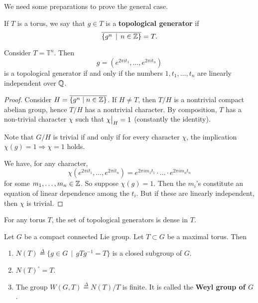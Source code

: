 \documentclass[11pt, english]{article}
\begin{document}
We need some preparations to prove the general case.

If $T$ is a torus, we say that $g \in T$ is a \textbf{topological generator} if
$$
\overline{ \{ g^n \, \mid \, n \in \mathbb{Z} \} } = T.
$$
\begin{thm}[Kronecker]
 Consider $T=\mathbb T^n$. Then
$$
g = \left(e^{2\pi i t_1}, \ldots, e^{2 \pi i t_n}  \right)
$$
is a topological generator if and only if the numbers $1, t_1, \ldots, t_n$ are linearly independent over $\mathbb{Q}$.
\end{thm}
\begin{proof}
Consider $H= \overline{\{ g^n \mid n \in \mathbb{Z} \}}$. If $H \neq T$, then $T/H$ is a nontrivial compact abelian group, hence $T/H$ has a nontrivial character. By composition, $T$ has a non-trivial character $\chi$ such that $\restr{\chi}{H} = 1$ (constantly the identity). 

Note that $G/H$ is trivial if and only if for every character $\chi$, the implication $\chi(g) = 1 \Rightarrow \chi =1 $ holds.

We have, for any character,
$$
\chi\left(e^{2 \pi i t_1}, \ldots, e^{2 \pi i t_n} \right) = e^{2 \pi i m_1t_1} \cdot \ldots \cdot e^{2 \pi i m_n t_n}
$$
for some $m_1,\ldots,m_n \in \mathbb{Z}$. So suppose $\chi(g)=1$. Then the $m_i$'s constitute an equation of linear dependence among the $t_i$. But if these are linearly independent, then $\chi$ is trivial. 
\end{proof}

\begin{corr}
  For any torus $T$, the set of topological generators is dense in $T$.
\end{corr}

\begin{prop}
  Let $G$ be a compact connected Lie group. Let $T \subset G$ be a maximal torus. Then
  \begin{enumerate}
  \item $N(T)  \stackrel{\Delta}{=} \{ g \in G \, \mid \, gTg^{-1} = T\}$ is a closed subgroup of $G$.
\item $N(T)^\circ = T$.
\item The group $W(G,T) \stackrel{\Delta}{=} N(T)/T$ is finite. It is called the \textbf{Weyl group of $G$}.
  \end{enumerate}
\end{prop}
\end{document}
